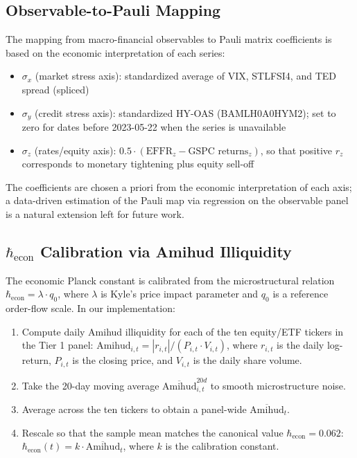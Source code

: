 \subsection{Observable-to-Pauli Mapping}\label{sec:pauli-mapping}

The mapping from macro-financial observables to Pauli matrix coefficients is
based on the economic interpretation of each series:
\begin{itemize}
    \item $\sigma_x$ (market stress axis): standardized average of VIX, STLFSI4,
        and TED spread (spliced)
    \item $\sigma_y$ (credit stress axis): standardized HY-OAS (BAMLH0A0HYM2);
        set to zero for dates before 2023-05-22 when the series is unavailable
    \item $\sigma_z$ (rates/equity axis): $0.5 \cdot (\text{EFFR}_z
        - \text{GSPC returns}_z)$, so that positive $r_z$ corresponds to
        monetary tightening plus equity sell-off
\end{itemize}

The coefficients are chosen a priori from the economic interpretation of each
axis; a data-driven estimation of the Pauli map via regression on the observable
panel is a natural extension left for future work.

\subsection{\texorpdfstring{$\hbar_{\mathrm{econ}}$}{hbar\_econ} Calibration via Amihud Illiquidity}
\label{sec:hbar-calibration}

The economic Planck constant is calibrated from the microstructural relation
$\hbar_{\mathrm{econ}} = \lambda \cdot q_0$, where $\lambda$ is Kyle's price
impact parameter and $q_0$ is a reference order-flow scale. In our
implementation:
\begin{enumerate}
    \item[(1)] Compute daily Amihud illiquidity for each of the ten
        equity/ETF tickers in the Tier 1 panel:
        $\text{Amihud}_{i,t} = |r_{i,t}| / (P_{i,t} \cdot V_{i,t})$, where
        $r_{i,t}$ is the daily log-return, $P_{i,t}$ is the closing price,
        and $V_{i,t}$ is the daily share volume.
    \item[(2)] Take the 20-day moving average
        $\overline{\text{Amihud}}_{i,t}^{20d}$ to smooth microstructure noise.
    \item[(3)] Average across the ten tickers to obtain a panel-wide
        $\overline{\text{Amihud}}_t$.
    \item[(4)] Rescale so that the sample mean matches the canonical value
        $\hbar_{\mathrm{econ}} = 0.062$:
        $\hbar_{\mathrm{econ}}(t) = k \cdot \overline{\text{Amihud}}_t$,
        where $k$ is the calibration constant.
\end{enumerate}

